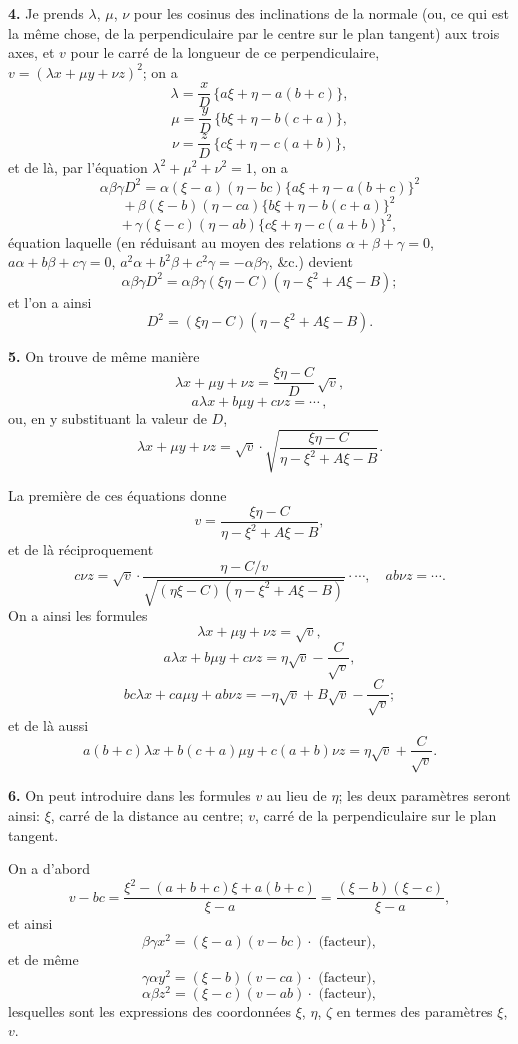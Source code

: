 \documentclass[11pt,a4paper]{article}
\begin{document}
\textbf{4.} Je prends $\lambda$, $\mu$, $\nu$ pour les cosinus des inclinations de la normale (ou, ce qui est la m\^eme chose, de la perpendiculaire par le centre sur le plan tangent) aux trois axes, et $v$ pour le carr\'e de la longueur de ce perpendiculaire, $v = (\lambda x + \mu y + \nu z)^2$; on a
\[
\lambda = \frac{x}{D}\,\{a\xi + \eta - a(b + c)\},
\]
\[
\mu = \frac{y}{D}\,\{b\xi + \eta - b(c + a)\},
\]
\[
\nu = \frac{z}{D}\,\{c\xi + \eta - c(a + b)\},
\]
et de l\`a, par l'\'equation $\lambda^2 + \mu^2 + \nu^2 = 1$, on a
\[
\alpha\beta\gamma D^2 = \alpha(\xi - a)(\eta - bc)\{a\xi + \eta - a(b + c)\}^2
\]
\[
+\,\beta(\xi - b)(\eta - ca)\{b\xi + \eta - b(c + a)\}^2
\]
\[
+\,\gamma(\xi - c)(\eta - ab)\{c\xi + \eta - c(a + b)\}^2,
\]
\'equation laquelle (en r\'eduisant au moyen des relations $\alpha + \beta + \gamma = 0$, $a\alpha + b\beta + c\gamma = 0$, $a^2\alpha + b^2\beta + c^2\gamma = -\alpha\beta\gamma$, \&c.) devient
\[
\alpha\beta\gamma D^2 = \alpha\beta\gamma(\xi\eta - C)(\eta - \xi^2 + A\xi - B);
\]
et l'on a ainsi
\[
D^2 = (\xi\eta - C)(\eta - \xi^2 + A\xi - B).
\]

\textbf{5.} On trouve de m\^eme mani\`ere
\[
\lambda x + \mu y + \nu z = \frac{\xi\eta - C}{D}\,\sqrt{v},
\]
\[
a\lambda x + b\mu y + c\nu z = \cdots\,,
\]
ou, en y substituant la valeur de $D$,
\[
\lambda x + \mu y + \nu z = \sqrt{v}\cdot\sqrt{\frac{\xi\eta - C}{\eta - \xi^2 + A\xi - B}}.
\]

La premi\`ere de ces \'equations donne
\[
v = \frac{\xi\eta - C}{\eta - \xi^2 + A\xi - B},
\]
et de l\`a r\'eciproquement
\[
c\nu z = \sqrt{v}\cdot\frac{\eta - C/v}{\sqrt{(\eta\xi - C)(\eta - \xi^2 + A\xi - B)}}\cdot\cdots,\quad ab\nu z = \cdots.
\]
On a ainsi les formules
\[
\lambda x + \mu y + \nu z = \sqrt{v},
\]
\[
a\lambda x + b\mu y + c\nu z = \eta\sqrt{v} - \frac{C}{\sqrt{v}},
\]
\[
bc\lambda x + ca\mu y + ab\nu z = -\eta\sqrt{v} + B\sqrt{v} - \frac{C}{\sqrt{v}};
\]
et de l\`a aussi
\[
a(b + c)\lambda x + b(c + a)\mu y + c(a + b)\nu z = \eta\sqrt{v} + \frac{C}{\sqrt{v}}.
\]

\textbf{6.} On peut introduire dans les formules $v$ au lieu de $\eta$; les deux param\`etres seront ainsi: $\xi$, carr\'e de la distance au centre; $v$, carr\'e de la perpendiculaire sur le plan tangent.

On a d'abord
\[
v - bc = \frac{\xi^2 - (a + b + c)\xi + a(b + c)}{\xi - a} = \frac{(\xi - b)(\xi - c)}{\xi - a},
\]
et ainsi
\[
\beta\gamma x^2 = (\xi - a)(v - bc)\cdot\,\,\text{(facteur)},
\]
et de m\^eme
\[
\gamma\alpha y^2 = (\xi - b)(v - ca)\cdot\,\,\text{(facteur)},
\]
\[
\alpha\beta z^2 = (\xi - c)(v - ab)\cdot\,\,\text{(facteur)},
\]
lesquelles sont les expressions des coordonn\'ees $\xi$, $\eta$, $\zeta$ en termes des param\`etres $\xi$, $v$.
\end{document}
